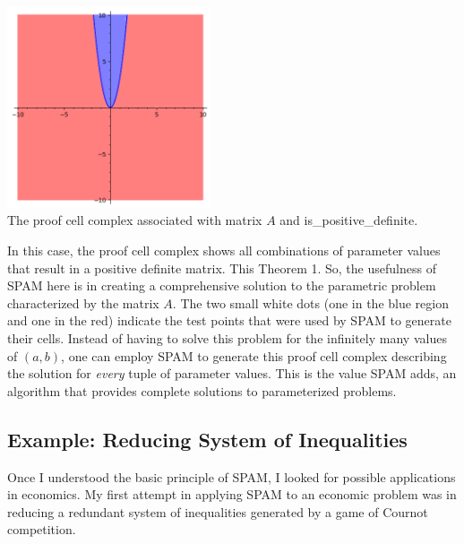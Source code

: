 \documentclass{article}
\begin{document}
\begin{center}
    \includegraphics[width=6cm]{posdef_graph.png} \\
    \caption{The proof cell complex associated with matrix $A$ and {\selectfont is\_positive\_definite.}}
\end{center}
\vspace{20pt}

In this case, the proof cell complex shows all combinations of parameter values that result in a positive definite matrix. This  Theorem 1. So, the usefulness of SPAM here is in creating a comprehensive solution to the parametric problem characterized by the matrix $A$. The two small white dots (one in the blue region and one in the red) indicate the test points that were used by SPAM to generate their cells. Instead of having to solve this problem for the infinitely many values of $(a,b)$, one can employ SPAM to generate this proof cell complex describing the solution for \textit{every} tuple of parameter values. This is the value SPAM adds, an algorithm that provides complete solutions to parameterized problems. 

\subsection{Example: Reducing System of Inequalities}

Once I understood the basic principle of SPAM, I looked for possible applications in economics. My first attempt in applying SPAM to an economic problem was in reducing a redundant system of inequalities generated by a game of Cournot competition. 
\end{document}
